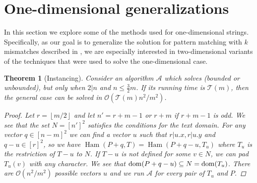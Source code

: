\documentclass[11pt]{article}
\renewcommand{\O}{\mathcal{O}}
\newcommand{\floor}[1]{\left\lfloor #1 \right\rfloor}
\theoremstyle{plain}
\newtheorem{theorem}{Theorem}
\theoremstyle{definition}
\theoremstyle{remark}
\DeclareMathOperator*{\Ham}{Ham}
\begin{document}
\section{One-dimensional generalizations}
In this section we explore some of the methods used for one-dimensional strings.
Specifically, as our goal is to generalize the solution for pattern matching with $k$ mismatches described in \cite{Gawrychowski2017}, we are especially interested in two-dimensional variants of the techniques that were used to solve the one-dimensional case.


\begin{theorem}[Instancing]\label{instancing}
	Consider an algorithm $\mathcal{A}$ which solves \HD (bounded or unbounded), but only when $2|n$ and $n \le \frac{3}{2}m$.
	If its running time is $\mathcal{T}(m)$, then the general case can be solved in $\O(\mathcal{T}(m) n^2 / m^2)$.
	\begin{proof}
		Let $r = \floor{m / 2}$ and let $n' = r + m - 1$ or $r + m$ if $r + m - 1$ is odd.
		We see that the set $N = [n']^2$ satisfies the conditions for the text domain.
		For any vector $q \in [n - m]^2$ we can find a vector $u$ such that $r|u.x, r|u.y$ and $q - u \in [r]^2$,
		so we have $\Ham(P + q, T) = \Ham(P + q - u, T_u)$ where $T_u$ is the restriction of $T - u$ to $N$.
		If $T - u$ is not defined for some $v \in N$, we can pad $T_u(v)$ with any character.
		We see that $\operatorname*{dom}(P + q - u) \subseteq N = \operatorname*{dom}(T_u)$.
		There are $\O(n^2 / m^2)$ possible vectors $u$ and we run $\mathcal{A}$ for every pair of $T_u$ and $P$.
	\end{proof}
\end{theorem}
\end{document}

